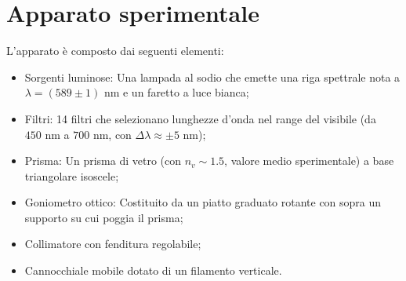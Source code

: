 \documentclass[10pt,twocolumn]{article}
\begin{document}
    \section{Apparato sperimentale}
    L'apparato è composto dai seguenti elementi:
    \begin{itemize}
        \item Sorgenti luminose: Una lampada al sodio che emette una riga spettrale nota a $\lambda = (589 \pm 1) \text{ nm}$ e un faretto a luce bianca;
        \item Filtri: 14 filtri che selezionano lunghezze d'onda nel range del visibile (da $450 \text{ nm}$ a $700 \text{ nm}$, con $\Delta\lambda \approx \pm 5 \text{ nm}$);
        \item Prisma: Un prisma di vetro (con $n_v \sim 1.5$, valore medio sperimentale) a base triangolare isoscele;
        \item Goniometro ottico: Costituito da un piatto graduato rotante con sopra un supporto su cui poggia il prisma;
        \item Collimatore con fenditura regolabile; 
        \item Cannocchiale mobile dotato di un filamento verticale.
    \end{itemize}
\end{document}
